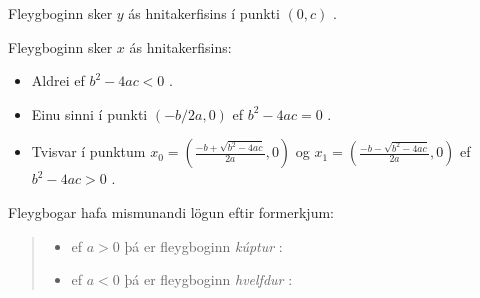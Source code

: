 \documentclass[a4paper,10pt,icelandic]{sphinxmanual}
\begin{document}
Fleygboginn sker \(y\) \sphinxhyphen{}ás hnitakerfisins í punkti \((0,c)\) .

Fleygboginn sker \(x\) \sphinxhyphen{}ás hnitakerfisins:
\begin{itemize}
\item {} 
Aldrei ef \(b^2-4ac<0\) .

\item {} 
Einu sinni í punkti \((-b/2a, 0)\) ef \(b^2-4ac=0\) .

\item {} 
Tvisvar í punktum \(x_0=\left(\frac{-b+\sqrt{b^2-4ac}}{2a},0 \right)\) og \(x_1= \left(\frac{-b-\sqrt{b^2-4ac}}{2a},0 \right)\) ef \(b^2-4ac>0\) .

\end{itemize}

Fleygbogar hafa mismunandi lögun eftir formerkjum:
\begin{quote}
\begin{itemize}
\item {} 
ef \(a>0\) þá er fleygboginn \textit{kúptur} :

\end{itemize}

\begin{itemize}
\item {} 
ef \(a<0\)  þá er fleygboginn \textit{hvelfdur} :

\end{itemize}

\end{quote}
\end{document}
